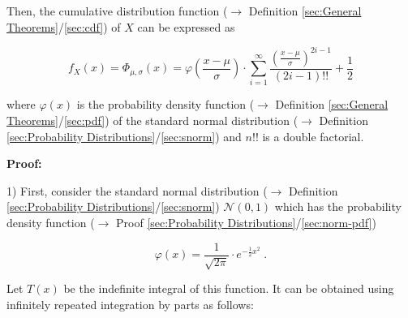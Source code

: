 \documentclass[a4paper,12pt,twoside]{book}
\begin{document}
Then, the cumulative distribution function ($\rightarrow$ Definition \ref{sec:General Theorems}/\ref{sec:cdf}) of $X$ can be expressed as

\begin{equation} \label{eq:norm-cdfwerf-norm-cdf}
f_X(x) = \Phi_{\mu,\sigma}(x) = \varphi\left( \frac{x-\mu}{\sigma} \right) \cdot \sum_{i=1}^{\infty} \frac{\left( \frac{x-\mu}{\sigma} \right)^{2i-1}}{(2i-1)!!} + \frac{1}{2}
\end{equation}

where $\varphi(x)$ is the probability density function ($\rightarrow$ Definition \ref{sec:General Theorems}/\ref{sec:pdf}) of the standard normal distribution ($\rightarrow$ Definition \ref{sec:Probability Distributions}/\ref{sec:snorm}) and $n!!$ is a double factorial.


\vspace{1em}
\textbf{Proof:}

1) First, consider the standard normal distribution ($\rightarrow$ Definition \ref{sec:Probability Distributions}/\ref{sec:snorm}) $\mathcal{N}(0, 1)$ which has the probability density function ($\rightarrow$ Proof \ref{sec:Probability Distributions}/\ref{sec:norm-pdf})

\begin{equation} \label{eq:norm-cdfwerf-snorm-pdf}
\varphi(x) = \frac{1}{\sqrt{2 \pi}} \cdot e^{-\frac{1}{2} x^2} \; .
\end{equation}

Let $T(x)$ be the indefinite integral of this function. It can be obtained using infinitely repeated integration by parts as follows:
\end{document}
